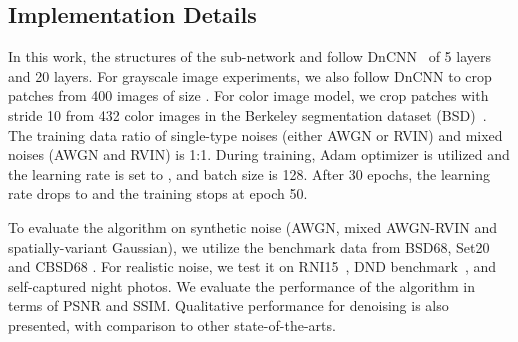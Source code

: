 \documentclass[letterpaper]{article} \usepackage{aaai20}  \usepackage{times}  \usepackage{helvet} \usepackage{courier}  \usepackage{comment}
\begin{document}
\subsection{Implementation Details}
In this work, the structures of the sub-network  and  follow DnCNN~\cite{zhang2017beyond} of 5 layers and 20 layers. For grayscale image experiments, we also follow DnCNN to crop  patches from 400 images of size . For color image model, we crop  patches with stride 10 from 432 color images in the Berkeley segmentation dataset (BSD)~\cite{roth2009fields}. The training data ratio of single-type noises (either AWGN or RVIN) and mixed noises (AWGN and RVIN) is 1:1. During training, Adam optimizer is utilized and the learning rate is set to , and batch size is 128. After 30 epochs, the learning rate drops to  and the training stops at epoch 50.

To evaluate the algorithm on synthetic noise (AWGN, mixed AWGN-RVIN and spatially-variant Gaussian), we utilize the benchmark data from BSD68, Set20~\cite{xu2016patch} and CBSD68 \cite{roth2009fields}. For realistic noise, we test it on RNI15~\cite{RNI15}, DND benchmark~\cite{plotz2017benchmarking}, and self-captured night photos. We evaluate the performance of the algorithm in terms of PSNR and SSIM. Qualitative performance for denoising is also presented, with comparison to other state-of-the-arts. 
\end{document}
